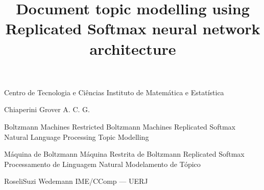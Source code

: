 
            {Centro de Tecnologia e Ciências}
            {Instituto de Matemática e Estatística}
            {}

      {Chiaperini Grover}
      {A. C. G.}

\title{Document topic modelling using Replicated Softmax neural network architecture}
         {Boltzmann Machines}
         {Restricted Boltzmann Machines}
         {Replicated Softmax}
         {Natural Language Processing}
         {Topic Modelling}

               {Máquina de Boltzmann}
               {Máquina Restrita de Boltzmann}
               {Replicated Softmax}
               {Processamento de Linguagem Natural}
               {Modelamento de Tópico}

           {Roseli}{Suzi Wedemann} 
           {IME/CComp --- UERJ} 




